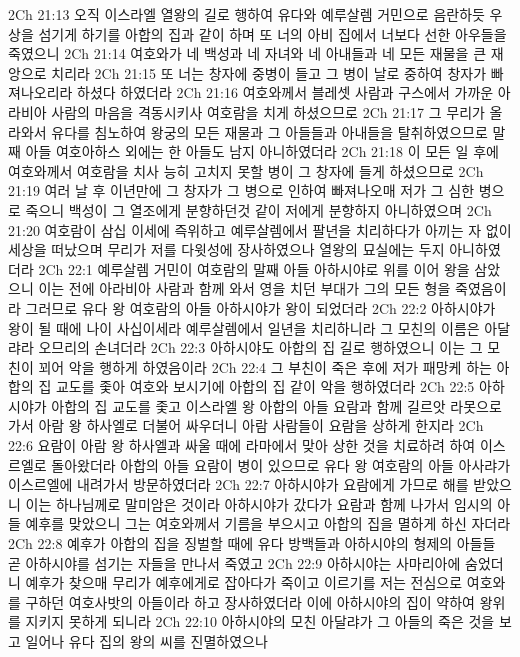 2Ch 21:13  오직 이스라엘 열왕의 길로 행하여 유다와 예루살렘 거민으로 음란하듯 우상을 섬기게 하기를 아합의 집과 같이 하며 또 너의 아비 집에서 너보다 선한 아우들을 죽였으니
2Ch 21:14  여호와가 네 백성과 네 자녀와 네 아내들과 네 모든 재물을 큰 재앙으로 치리라
2Ch 21:15  또 너는 창자에 중병이 들고 그 병이 날로 중하여 창자가 빠져나오리라 하셨다 하였더라
2Ch 21:16  여호와께서 블레셋 사람과 구스에서 가까운 아라비아 사람의 마음을 격동시키사 여호람을 치게 하셨으므로
2Ch 21:17  그 무리가 올라와서 유다를 침노하여 왕궁의 모든 재물과 그 아들들과 아내들을 탈취하였으므로 말째 아들 여호아하스 외에는 한 아들도 남지 아니하였더라
2Ch 21:18  이 모든 일 후에 여호와께서 여호람을 치사 능히 고치지 못할 병이 그 창자에 들게 하셨으므로
2Ch 21:19  여러 날 후 이년만에 그 창자가 그 병으로 인하여 빠져나오매 저가 그 심한 병으로 죽으니 백성이 그 열조에게 분향하던것 같이 저에게 분향하지 아니하였으며
2Ch 21:20  여호람이 삼십 이세에 즉위하고 예루살렘에서 팔년을 치리하다가 아끼는 자 없이 세상을 떠났으며 무리가 저를 다윗성에 장사하였으나 열왕의 묘실에는 두지 아니하였더라
2Ch 22:1  예루살렘 거민이 여호람의 말째 아들 아하시야로 위를 이어 왕을 삼았으니 이는 전에 아라비아 사람과 함께 와서 영을 치던 부대가 그의 모든 형을 죽였음이라 그러므로 유다 왕 여호람의 아들 아하시야가 왕이 되었더라
2Ch 22:2  아하시야가 왕이 될 때에 나이 사십이세라 예루살렘에서 일년을 치리하니라 그 모친의 이름은 아달랴라 오므리의 손녀더라
2Ch 22:3  아하시야도 아합의 집 길로 행하였으니 이는 그 모친이 꾀어 악을 행하게 하였음이라
2Ch 22:4  그 부친이 죽은 후에 저가 패망케 하는 아합의 집 교도를 좇아 여호와 보시기에 아합의 집 같이 악을 행하였더라
2Ch 22:5  아하시야가 아합의 집 교도를 좇고 이스라엘 왕 아합의 아들 요람과 함께 길르앗 라못으로 가서 아람 왕 하사엘로 더불어 싸우더니 아람 사람들이 요람을 상하게 한지라
2Ch 22:6  요람이 아람 왕 하사엘과 싸울 때에 라마에서 맞아 상한 것을 치료하려 하여 이스르엘로 돌아왔더라 아합의 아들 요람이 병이 있으므로 유다 왕 여호람의 아들 아사랴가 이스르엘에 내려가서 방문하였더라
2Ch 22:7  아하시야가 요람에게 가므로 해를 받았으니 이는 하나님께로 말미암은 것이라 아하시야가 갔다가 요람과 함께 나가서 임시의 아들 예후를 맞았으니 그는 여호와께서 기름을 부으시고 아합의 집을 멸하게 하신 자더라
2Ch 22:8  예후가 아합의 집을 징벌할 때에 유다 방백들과 아하시야의 형제의 아들들 곧 아하시야를 섬기는 자들을 만나서 죽였고
2Ch 22:9  아하시야는 사마리아에 숨었더니 예후가 찾으매 무리가 예후에게로 잡아다가 죽이고 이르기를 저는 전심으로 여호와를 구하던 여호사밧의 아들이라 하고 장사하였더라 이에 아하시야의 집이 약하여 왕위를 지키지 못하게 되니라
2Ch 22:10  아하시야의 모친 아달랴가 그 아들의 죽은 것을 보고 일어나 유다 집의 왕의 씨를 진멸하였으나
